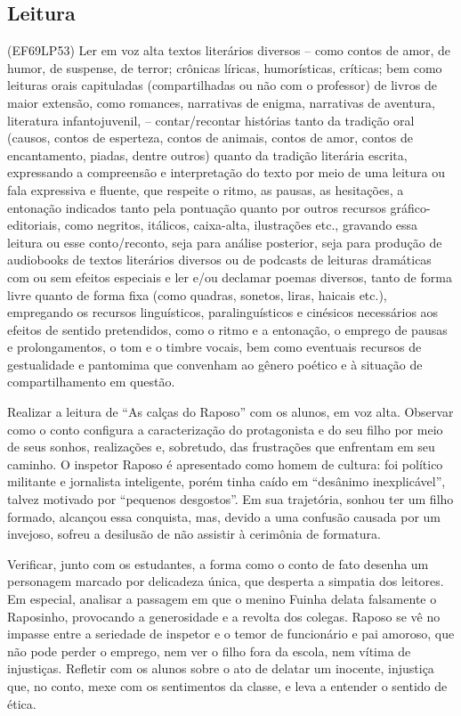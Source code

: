 \subsection{Leitura}

(EF69LP53) Ler em voz alta textos literários diversos – como contos de amor, de humor, de suspense, de terror; crônicas líricas, humorísticas, críticas; bem como leituras orais capituladas (compartilhadas ou não com o professor) de livros de maior extensão, como romances, narrativas de enigma, narrativas de aventura, literatura infantojuvenil, – contar/recontar histórias tanto da tradição oral (causos, contos de esperteza, contos de animais, contos de amor, contos de encantamento, piadas, dentre outros) quanto da tradição literária escrita, expressando a compreensão e interpretação do texto por meio de uma leitura ou fala expressiva e fluente, que respeite o ritmo, as pausas, as hesitações, a entonação indicados tanto pela pontuação quanto por outros recursos gráfico-editoriais, como negritos, itálicos, caixa-alta, ilustrações etc., gravando essa leitura ou esse conto/reconto, seja para análise posterior, seja para produção de audiobooks de textos literários diversos ou de podcasts de leituras dramáticas com ou sem efeitos especiais e ler e/ou declamar poemas diversos, tanto de forma livre quanto de forma fixa (como quadras, sonetos, liras, haicais etc.), empregando os recursos linguísticos, paralinguísticos e cinésicos necessários aos efeitos de sentido pretendidos, como o ritmo e a entonação, o emprego de pausas e prolongamentos, o tom e o timbre vocais, bem como eventuais recursos de gestualidade e pantomima que convenham ao gênero poético e à situação de compartilhamento em questão.

Realizar a leitura de ``As calças do Raposo'' com os alunos, em voz
alta. Observar como o conto configura a caracterização do protagonista e
do seu filho por meio de seus sonhos, realizações e, sobretudo, das
frustrações que enfrentam em seu caminho. O inspetor Raposo é
apresentado como homem de cultura: foi político militante e jornalista
inteligente, porém tinha caído em ``desânimo inexplicável'', talvez
motivado por ``pequenos desgostos''. Em sua trajetória, sonhou ter um
filho formado, alcançou essa conquista, mas, devido a uma confusão
causada por um invejoso, sofreu a desilusão de não assistir à cerimônia
de formatura.

Verificar, junto com os estudantes, a forma como o conto de fato desenha
um personagem marcado por delicadeza única, que desperta a simpatia dos
leitores. Em especial, analisar a passagem em que o menino Fuinha delata
falsamente o Raposinho, provocando a generosidade e a revolta dos
colegas. Raposo se vê no impasse entre a seriedade de inspetor e o temor
de funcionário e pai amoroso, que não pode perder o emprego, nem ver o
filho fora da escola, nem vítima de injustiças. Refletir com os alunos
sobre o ato de delatar um inocente, injustiça que, no conto, mexe com os
sentimentos da classe, e leva a entender o sentido de ética.

